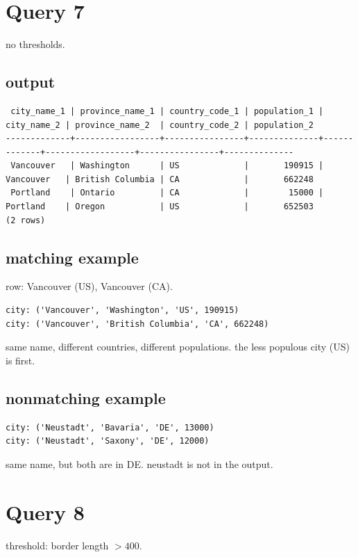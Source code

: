 \documentclass[11pt]{article}
\begin{document}
\section*{Query 7}

no thresholds.

\subsection*{output}
{\tiny
\begin{verbatim}
 city_name_1 | province_name_1 | country_code_1 | population_1 | city_name_2 | province_name_2  | country_code_2 | population_2
-------------+-----------------+----------------+--------------+-------------+------------------+----------------+--------------
 Vancouver   | Washington      | US             |       190915 | Vancouver   | British Columbia | CA             |       662248
 Portland    | Ontario         | CA             |        15000 | Portland    | Oregon           | US             |       652503
(2 rows)
\end{verbatim}
}

\subsection*{matching example}
row: Vancouver (US), Vancouver (CA).
\begin{verbatim}
city: ('Vancouver', 'Washington', 'US', 190915)
city: ('Vancouver', 'British Columbia', 'CA', 662248)
\end{verbatim}
same name, different countries, different populations. the less populous city (US) is first.

\subsection*{nonmatching example}
\begin{verbatim}
city: ('Neustadt', 'Bavaria', 'DE', 13000)
city: ('Neustadt', 'Saxony', 'DE', 12000)
\end{verbatim}
same name, but both are in DE. neustadt is not in the output.

\section*{Query 8}

threshold: border length $> 400$.
\end{document}
